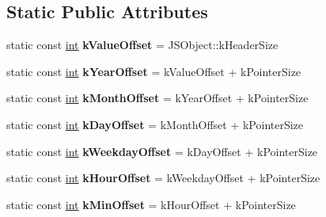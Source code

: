 \subsection*{Static Public Attributes}
\begin{DoxyCompactItemize}
\item 
\mbox{\label{classv8_1_1internal_1_1JSDate_a42f62e74380a2fde764c5efe7605e0c7}} 
static const \mbox{\hyperlink{classint}{int}} {\bfseries k\+Value\+Offset} = J\+S\+Object\+::k\+Header\+Size
\item 
\mbox{\label{classv8_1_1internal_1_1JSDate_ac70d435cc4b8043aea093053d814b711}} 
static const \mbox{\hyperlink{classint}{int}} {\bfseries k\+Year\+Offset} = k\+Value\+Offset + k\+Pointer\+Size
\item 
\mbox{\label{classv8_1_1internal_1_1JSDate_a871a1beff8b50dde5806d2c0c6d99a51}} 
static const \mbox{\hyperlink{classint}{int}} {\bfseries k\+Month\+Offset} = k\+Year\+Offset + k\+Pointer\+Size
\item 
\mbox{\label{classv8_1_1internal_1_1JSDate_a18c495bfb324c1fc0291bcaa90dd4955}} 
static const \mbox{\hyperlink{classint}{int}} {\bfseries k\+Day\+Offset} = k\+Month\+Offset + k\+Pointer\+Size
\item 
\mbox{\label{classv8_1_1internal_1_1JSDate_a524c26a7e64b392e0867f4a8765ad569}} 
static const \mbox{\hyperlink{classint}{int}} {\bfseries k\+Weekday\+Offset} = k\+Day\+Offset + k\+Pointer\+Size
\item 
\mbox{\label{classv8_1_1internal_1_1JSDate_ae21c9b039f413f20a28fabc87d7fdb7f}} 
static const \mbox{\hyperlink{classint}{int}} {\bfseries k\+Hour\+Offset} = k\+Weekday\+Offset + k\+Pointer\+Size
\item 
\mbox{\label{classv8_1_1internal_1_1JSDate_a3f1f64a3808e921e2a4b1c550f24861b}} 
static const \mbox{\hyperlink{classint}{int}} {\bfseries k\+Min\+Offset} = k\+Hour\+Offset + k\+Pointer\+Size
\item 
\mbox{\label{classv8_1_1internal_1_1JSDate_ad65d0f71fce7a37d4195b695b27152fc}} 

\end{DoxyCompactItemize}
